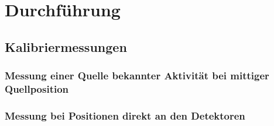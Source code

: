 \section{Durchführung}

\subsection{Kalibriermessungen}
    \subsubsection{Messung einer Quelle bekannter Aktivität bei mittiger Quellposition}
       \minipanf 
        \makebox[\textwidth]{\scalebox{0.5}{}}
       \minipend
       \vspace{2mm}
       \minipanf 
        \makebox[\textwidth]{\scalebox{0.5}{}}
       \minipend
       \vspace{2mm}
       \minipanf 
        \makebox[\textwidth]{\scalebox{0.4}{}}
       \minipend
    \subsubsection{Messung bei Positionen direkt an den Detektoren}

